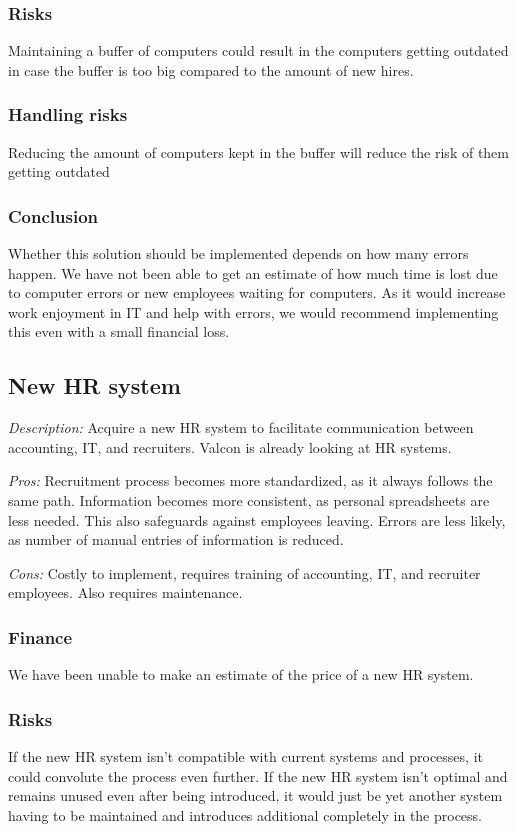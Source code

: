 \subsubsection{Risks}
Maintaining a buffer of computers could result in the computers getting outdated in case the buffer is too big compared to the amount of new hires.

\subsubsection{Handling risks}
Reducing the amount of computers kept in the buffer will reduce the risk of them getting outdated

\subsubsection{Conclusion}
Whether this solution should be implemented depends on how many errors happen.
We have not been able to get an estimate of how much time is lost due to computer errors or new employees waiting for computers.
As it would increase work enjoyment in IT and help with errors, we would recommend implementing this even with a small financial loss.

\subsection{New HR system}
\emph{Description:} Acquire a new HR system to facilitate communication between accounting, IT, and recruiters.
Valcon is already looking at HR systems.

\emph{Pros:} Recruitment process becomes more standardized, as it always follows the same path.
Information becomes more consistent, as personal spreadsheets are less needed. 
This also safeguards against employees leaving.
Errors are less likely, as number of manual entries of information is reduced.

\emph{Cons:} Costly to implement, requires training of accounting, IT, and recruiter employees.
Also requires maintenance.

\subsubsection{Finance}
We have been unable to make an estimate of the price of a new HR system.

\subsubsection{Risks}
If the new HR system isn't compatible with current systems and processes, it could convolute the process even further. 
If the new HR system isn't optimal and remains unused even after being introduced, it would just be yet another system having to be maintained and introduces additional completely in the process.


